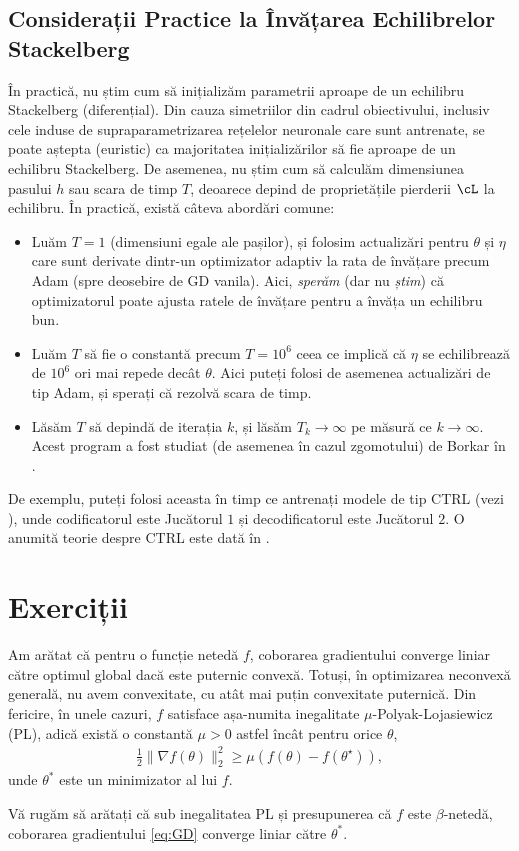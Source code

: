 \documentclass[../../book-main_ro.tex]{subfiles}
\begin{document}
\subsection{Considerații Practice la Învățarea Echilibrelor Stackelberg}

În practică, nu știm cum să inițializăm parametrii aproape de un echilibru Stackelberg (diferențial). Din cauza simetriilor din cadrul obiectivului, inclusiv cele induse de supraparametrizarea rețelelor neuronale care sunt antrenate, se poate aștepta (euristic) ca majoritatea inițializărilor să fie aproape de un echilibru Stackelberg. De asemenea, nu știm cum să calculăm dimensiunea pasului \(h\) sau scara de timp \(T\), deoarece depind de proprietățile pierderii \(\cL\) la echilibru. În practică, există câteva abordări comune:
\begin{itemize}
    \item Luăm \(T = 1\) (dimensiuni egale ale pașilor), și folosim actualizări pentru \(\theta\) și \(\eta\) care sunt derivate dintr-un optimizator adaptiv la rata de învățare precum Adam (spre deosebire de GD vanila). Aici, \textit{sperăm} (dar nu \textit{știm}) că optimizatorul poate ajusta ratele de învățare pentru a învăța un echilibru bun.
    \item Luăm \(T\) să fie o constantă precum \(T = 10^{6}\) ceea ce implică că \(\eta\) se echilibrează de \(10^{6}\) ori mai repede decât \(\theta\). Aici puteți folosi de asemenea actualizări de tip Adam, și sperați că rezolvă scara de timp.
    \item Lăsăm \(T\) să depindă de iterația \(k\), și lăsăm \(T_{k} \to \infty\) pe măsură ce \(k \to \infty\). Acest program a fost studiat (de asemenea în cazul zgomotului) de Borkar în \cite{borkar1997stochastic}.
\end{itemize}
De exemplu, puteți folosi aceasta în timp ce antrenați modele de tip CTRL (vezi ), unde codificatorul este Jucătorul \(1\) și decodificatorul este Jucătorul \(2\). O anumită teorie despre CTRL este dată în .

\section{Exerciții}

\begin{exercise}
    Am arătat că pentru o funcție netedă $f$, coborarea gradientului converge liniar către optimul global dacă este puternic convexă. Totuși, în optimizarea neconvexă generală, nu avem convexitate, cu atât mai puțin convexitate puternică. Din fericire, în unele cazuri, $f$ satisface așa-numita inegalitate $\mu$-Polyak-Lojasiewicz (PL), adică există o constantă $\mu > 0$ astfel încât pentru orice $\theta$, 
    \begin{align*}
        \frac{1}{2}\|\nabla f(\theta)\|_2^2 \ge \mu\left( f(\theta) - f(\theta^\star) \right),
    \end{align*}
    unde $\theta^*$ este un minimizator al lui $f$. 
    
    Vă rugăm să arătați că sub inegalitatea PL și presupunerea că $f$ este $\beta$-netedă, coborarea gradientului \eqref{eq:GD} converge liniar către $\theta^*$. 
\end{exercise}
\end{document}
